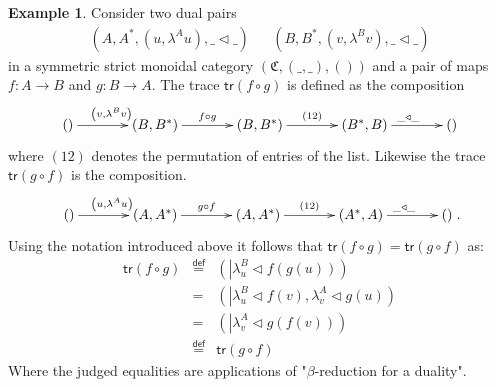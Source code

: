 \documentclass[pra,floatfix,
amsmath,superscriptaddress, 12pt]{article}
\theoremstyle{definition}
\newtheorem*{example}{Example}
\begin{document}
\begin{example}
Consider two dual pairs 
\begin{align*}
\left(A,A^{*},\left(u,\lambda^{A}u\right),\_\triangleleft\_\right)
&&
\left(B,B^{*},\left(v,\lambda^{B}v\right),\_\triangleleft\_\right)
\end{align*}
in a symmetric strict monoidal category $\left(\mathfrak{C},\left(\_,\_\right),\left(\right)\right)$
and a pair of maps $f:A\longrightarrow B$
 and $g:B \longrightarrow A$. The trace $\mathsf{tr}\left(f\circ g\right)$ is defined as the composition 
\[
\xymatrixrowsep{0pc}\xymatrixcolsep{3pc}\xymatrix{\left(\right)\ar[r]^{\left(v,\lambda^{B}v\right)} & \left(B,B^{*}\right)\ar[r]^{f\circ g} & \left(B,B^{*}\right)\ar[r]^{\left(12\right)} & \left(B^{*},B\right)\ar[r]^{\_\triangleleft\_} & \left(\right)}
\]
where $(12)$ denotes the permutation of entries of the list. Likewise the trace $\mathsf{tr}\left(g\circ f\right)$ is the composition.
\[
\xymatrixrowsep{0pc}\xymatrixcolsep{3pc}\xymatrix{\left(\right)\ar[r]^{\left(u,\lambda^{A}u\right)} & \left(A,A^{*}\right)\ar[r]^{g\circ f} & \left(A,A^{*}\right)\ar[r]^{\left(12\right)} & \left(A^{*},A\right)\ar[r]^{\_\triangleleft\_} & \left(\right)}
.
\]
Using the notation introduced above it follows that $\mathsf{tr}\left(f\circ g\right)=\mathsf{tr}\left(g\circ f\right)$ as:
\begin{eqnarray*}
\mathsf{tr}\left(f\circ g\right) & \overset{\mathsf{def}}{=} & \left(\left|\lambda_{u}^{B}\triangleleft f\left(g\left(u\right)\right)\right.\right)\\
 & = & \left(\left|\lambda_{u}^{B}\triangleleft f\left(v\right)\right.,\lambda_{v}^{A}\triangleleft g\left(u\right)\right)\\
 & = & \left(\left|\lambda_{v}^{A}\triangleleft g\left(f\left(v\right)\right)\right.\right)\\
 & \overset{\mathsf{def}}{=} & \mathsf{tr}\left(g\circ f\right)
\end{eqnarray*}
Where the judged equalities are applications of "$\beta$-reduction
for a duality".
\end{example}
\end{document}
